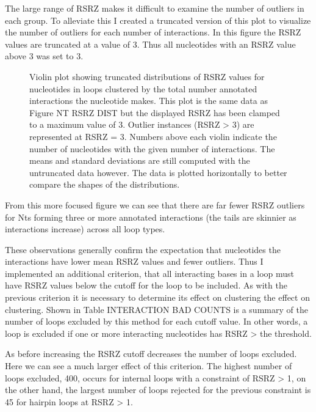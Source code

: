 The large range of RSRZ makes it difficult to examine the number of outliers in
each group. To alleviate this I created a truncated version of this plot to
visualize the number of outliers for each number of interactions. In this figure
the RSRZ values are truncated at a value of 3. Thus all nucleotides with an RSRZ
value above 3 was set to 3. 

\begin{figure}
  \caption{Violin plot showing truncated distributions of RSRZ values for
    nucleotides in loops clustered by the total number annotated interactions
    the nucleotide makes. This plot is the same data as Figure NT RSRZ DIST but
    the displayed RSRZ has been clamped to a maximum value of 3. Outlier
    instances (RSRZ > 3) are represented at RSRZ = 3. Numbers above each violin
    indicate the number of nucleotides with the given number of interactions.
    The means and standard deviations are still computed with the untruncated
    data however. The data is plotted horizontally to better compare the shapes
  of the distributions.}
\end{figure}

From this more focused figure we can see that there are far fewer RSRZ outliers
for Nts forming three or more annotated interactions (the tails are skinnier as
interactions increase) across all loop types. 

These observations generally confirm the expectation that nucleotides the
interactions have lower mean RSRZ values and fewer outliers. Thus I implemented
an additional criterion, that all interacting bases in a loop must have RSRZ
values below the cutoff for the loop to be included. As with the previous
criterion it is necessary to determine its effect on clustering the effect on
clustering. Shown in Table INTERACTION BAD COUNTS is a summary of the number of
loops excluded by this method for each cutoff value. In other words, a loop is
excluded if one or more interacting nucleotides has RSRZ > the threshold.

\begin{table}
  \begin{tabular}
  \end{tabular}
  \caption{Counts and percent of all loops extracted that are rejected by
    requiring all bases with annotated interactions passing each RSRZ cutoff.
    The percentages are the percent of all loops that are rejected by the
  cutoff.}
\end{table}

As before increasing the RSRZ cutoff decreases the number of loops excluded.
Here we can see a much larger effect of this criterion. The highest number of
loops excluded, 400, occurs for internal loops with a constraint of RSRZ > 1, on
the other hand, the largest number of loops rejected for the previous constraint
is 45 for hairpin loops at RSRZ > 1. 

